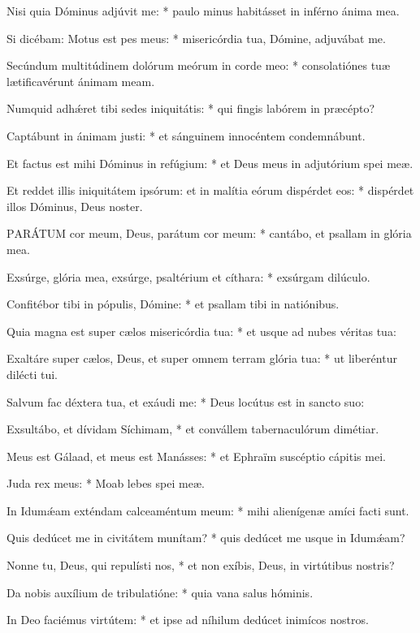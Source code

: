 Nisi quia Dóminus adjúvit me: * paulo minus habitásset in inférno ánima mea.

Si dicébam: Motus est pes meus: * misericórdia tua, Dómine, adjuvábat me.

Secúndum multitúdinem dolórum meórum in corde meo: * consolatiónes tuæ lætificavérunt ánimam meam.

Numquid adhǽret tibi sedes iniquitátis: * qui fingis labórem in præcépto?

Captábunt in ánimam justi: * et sánguinem innocéntem condemnábunt.

Et factus est mihi Dóminus in refúgium: * et Deus meus in adjutórium spei meæ.

Et reddet illis iniquitátem ipsórum: et in malítia eórum dispérdet eos: * dispérdet illos Dóminus, Deus noster.


\lettrine[lines=2]{P}{ARÁTUM} cor meum, Deus, parátum cor meum: * cantábo, et psallam in glória mea.

Exsúrge, glória mea, exsúrge, psaltérium et cíthara: * exsúrgam dilúculo.

Confitébor tibi in pópulis, Dómine: * et psallam tibi in natiónibus.

Quia magna est super cælos misericórdia tua: * et usque ad nubes véritas tua:

Exaltáre super cælos, Deus, et super omnem terram glória tua: * ut liberéntur dilécti tui.

Salvum fac déxtera tua, et exáudi me: * Deus locútus est in sancto suo:

Exsultábo, et dívidam Síchimam, * et convállem tabernaculórum dimétiar.

Meus est Gálaad, et meus est Manásses: * et Ephraïm suscéptio cápitis mei.

Juda rex meus: * Moab lebes spei meæ.

In Idumǽam exténdam calceaméntum meum: * mihi alienígenæ amíci facti sunt.

Quis dedúcet me in civitátem munítam? * quis dedúcet me usque in Idumǽam?

Nonne tu, Deus, qui repulísti nos, * et non exíbis, Deus, in virtútibus nostris?

Da nobis auxílium de tribulatióne: * quia vana salus hóminis.

In Deo faciémus virtútem: * et ipse ad níhilum dedúcet inimícos nostros.


